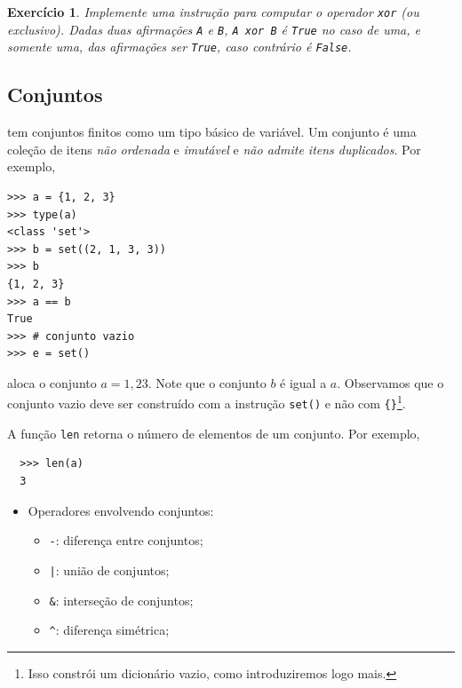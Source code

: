 \documentclass[12pt]{article}
\newtheorem{exr}{Exercício}[section]
\begin{document}
\begin{exr}
  Implemente uma instrução para computar o operador \lstinline+xor+ (ou exclusivo). Dadas duas afirmações \lstinline+A+ e \lstinline+B+, \lstinline+A xor B+ é \lstinline+True+ no caso de uma, e somente uma, das afirmações ser \lstinline+True+, caso contrário é \lstinline+False+.
\end{exr}


\subsection{Conjuntos}

{\python} tem conjuntos finitos como um tipo básico de variável. Um conjunto é uma coleção de itens \emph{não ordenada} e \emph{imutável} e \emph{não admite itens duplicados}. Por exemplo,
\begin{lstlisting}
>>> a = {1, 2, 3}
>>> type(a)
<class 'set'>
>>> b = set((2, 1, 3, 3))
>>> b
{1, 2, 3}
>>> a == b
True
>>> # conjunto vazio
>>> e = set()
\end{lstlisting}
aloca o conjunto $a = {1,2 3}$. Note que o conjunto $b$ é igual a $a$. Observamos que o conjunto vazio deve ser construído com a instrução \lstinline+set()+ e não com \lstinline+{}+\footnote{Isso constrói um dicionário vazio, como introduziremos logo mais.}.

\begin{obs}
  A função {\python} \lstinline+len+ retorna o número de elementos de um conjunto. Por exemplo,
  \begin{lstlisting}
  >>> len(a)
  3
  \end{lstlisting}
\end{obs}

\begin{itemize}
\item Operadores envolvendo conjuntos:
  \begin{itemize}
  \item[] \lstinline+-+: diferença entre conjuntos;
  \item[] \lstinline+|+: união de conjuntos;
  \item[] \lstinline+&+: interseção de conjuntos;
  \item[] \lstinline+^+: diferença simétrica;
  \end{itemize}
\end{itemize}
\end{document}
